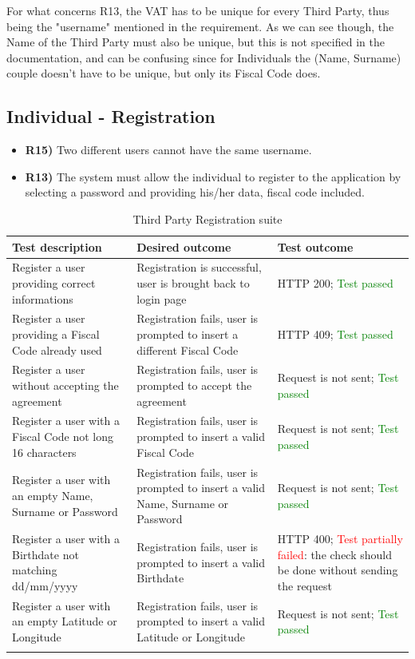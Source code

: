 \documentclass[titlepage]{article}
\begin{document}
\noindent
For what concerns R13, the VAT has to be unique for every Third Party, thus being the "username" mentioned in the requirement. As we can see though, the Name of the Third Party must also be unique, but this is not specified in the documentation, and can be confusing since for Individuals the (Name, Surname) couple doesn't have to be unique, but only its Fiscal Code does. \newline


\subsection{Individual - Registration}
\begin{itemize}
    \item {\bf R15)} Two different users cannot have the same username.
    \item {\bf R13)} The system must allow the individual to register to the application by selecting a password and providing his/her data, fiscal code included.
\end{itemize}

\renewcommand*{\arraystretch}{1.4}
\begin{longtable}{| p{3 cm} | p{4 cm} | p{4 cm} |} \hline
    {\bf Test description} & {\bf Desired outcome} & {\bf Test outcome} \\ \hline
    Register a user providing correct informations & 
    Registration is successful, user is brought back to login page
        & HTTP 200; \textcolor{green}{Test passed} \\ \hline
    Register a user providing a Fiscal Code already used & 
    Registration fails, user is prompted to insert a different Fiscal Code
        & HTTP 409; \textcolor{green}{Test passed} \\ \hline
    Register a user without accepting the agreement & 
    Registration fails, user is prompted to accept the agreement
        & Request is not sent; \textcolor{green}{Test passed} \\ \hline
    Register a user with a Fiscal Code not long 16 characters & 
    Registration fails, user is prompted to insert a valid Fiscal Code
        & Request is not sent; \textcolor{green}{Test passed} \\ \hline
    Register a user with an empty Name, Surname or Password & 
    Registration fails, user is prompted to insert a valid Name, Surname or Password
        & Request is not sent; \textcolor{green}{Test passed} \\ \hline
    Register a user with a Birthdate not matching dd/mm/yyyy & 
    Registration fails, user is prompted to insert a valid Birthdate
        & HTTP 400; \textcolor{red}{Test partially failed}: the check should be done without sending the request \\ \hline
    Register a user with an empty Latitude or Longitude & 
    Registration fails, user is prompted to insert a valid Latitude or Longitude
        & Request is not sent; \textcolor{green}{Test passed} \\ \hline
    \caption{Third Party Registration suite}
\end{longtable}
\end{document}
